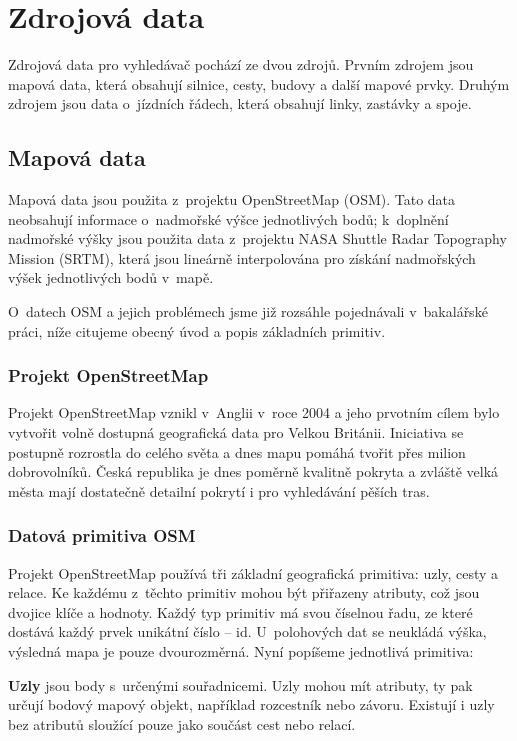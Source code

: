 \chapter{Zdrojová data}

Zdrojová data pro vyhledávač pochází ze dvou zdrojů. Prvním zdrojem jsou mapová
data, která obsahují silnice, cesty, budovy a další mapové prvky. Druhým zdrojem
jsou data o~jízdních řádech, která obsahují linky, zastávky a spoje.

\section{Mapová data}
Mapová data jsou použita z~projektu OpenStreetMap\cite{OSM} (OSM). Tato data neobsahují
informace o~nadmořské výšce jednotlivých bodů; k~doplnění nadmořské výšky jsou
použita data z~projektu NASA Shuttle Radar Topography Mission (SRTM), která jsou
lineárně interpolována pro získání nadmořských výšek jednotlivých bodů v~mapě.

O~datech OSM a jejich problémech jsme již rozsáhle pojednávali v~bakalářské
práci\cite{bakalarka}, níže citujeme obecný úvod a popis základních primitiv. 
\newcommand{\tuc}{\bf}
\subsection{Projekt OpenStreetMap}
Projekt OpenStreetMap\cite{OSM} vznikl v~Anglii v~roce 2004 a jeho prvotním cílem bylo
vytvořit volně dostupná geografická data pro Velkou Británii. Iniciativa se
postupně rozrostla do celého světa a dnes mapu pomáhá tvořit přes milion
dobrovolníků. Česká republika je dnes poměrně kvalitně pokryta a zvláště velká
města mají dostatečně detailní pokrytí i pro vyhledávání pěších tras.

\subsection{Datová primitiva OSM} 
Projekt OpenStreetMap používá tři základní geografická primitiva: uzly, cesty a
relace. Ke každému z~těchto primitiv mohou být přiřazeny atributy, což jsou
dvojice klíče a hodnoty. Každý typ primitiv má svou číselnou řadu, ze které
dostává každý prvek unikátní číslo -- id. 
U~polohových dat se neukládá výška, výsledná mapa je pouze dvourozměrná.
Nyní popíšeme jednotlivá primitiva:

{\tuc Uzly} jsou body s~určenými souřadnicemi. Uzly mohou mít atributy, ty pak
určují bodový mapový objekt, například rozcestník nebo závoru. Existují i uzly
bez atributů sloužící pouze jako součást cest nebo relací.

